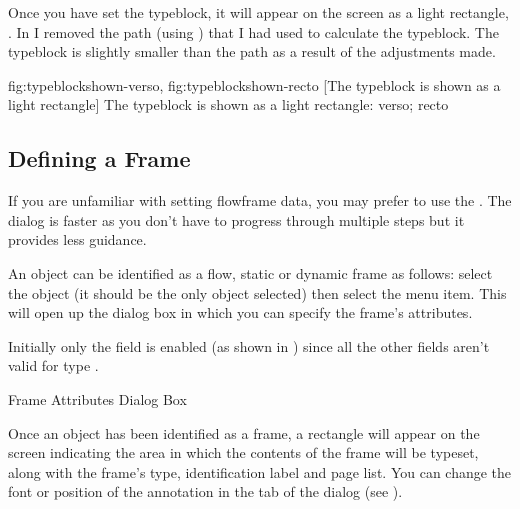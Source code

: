 Once you have set the \gls{typeblock}, it will appear on the screen as
a light  rectangle,  . In
 I removed the \gls{path} (using
) that I had used to calculate the \gls{typeblock}. The
\gls{typeblock} is slightly smaller than the \gls*{path} as a result of
the adjustments made.

{
 {fig:typeblockshown-verso}{}{},
 {fig:typeblockshown-recto}{}{}
}
[The typeblock is shown as a light  rectangle]
{The typeblock is shown as a light  rectangle:
 verso;
 recto}

\subsection{Defining a Frame}\label{sec:framedef}

If you are unfamiliar with setting \gls{flowframe} data, you may
prefer to use the . The  dialog
is faster as you don't have to progress through multiple steps but
it provides less guidance.


An \gls{object} can be identified as a flow, static or
dynamic frame as follows: select the \gls{object} (it should
be the only \gls*{object} selected) then select the
 menu item.
This will open up the  dialog box in which you can specify the frame's
attributes. 


Initially only the  field
is enabled (as shown in ) since all the other
fields aren't valid for type .


{}
{Frame Attributes Dialog Box}

Once an \gls*{object} has been identified as a frame, a
 rectangle will appear on the screen indicating the area in
which the contents of the frame will be typeset, along with the
frame's type, identification label and page list.
You can change the font or position of the annotation in the
 tab of the  dialog
(see ).

